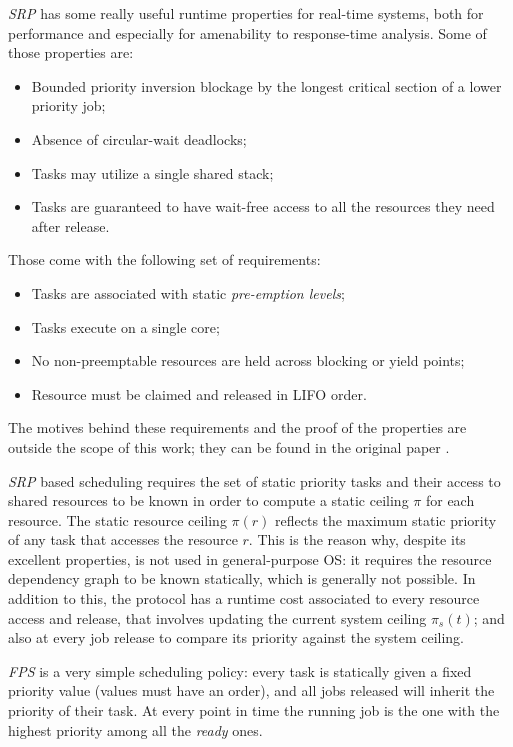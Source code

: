 \textit{SRP} has some really useful runtime properties for real-time systems,
both for performance and especially for amenability to response-time analysis.
Some of those properties are: 
\label{lab:rtic-properties}
\begin{itemize}
  \item Bounded priority inversion blockage by the longest critical section
  of a lower priority job; 
  \item Absence of circular-wait deadlocks;
  \item Tasks may utilize a single shared stack;
  \item Tasks are guaranteed to have wait-free access to all the resources
  they need after release. 
\end{itemize}
Those come with the following set of requirements:
\begin{itemize}
  \item Tasks are associated with static \textit{pre-emption levels};
  \item Tasks execute on a single core;
  \item No non-preemptable resources are held across blocking or yield points;
  \item Resource must be claimed and released in LIFO order.
\end{itemize}
The motives behind these requirements and the proof of the properties are
outside the scope of this work; they can be found in the original paper
\cite{bakerStackbasedSchedulingRealtime1991}. 

\textit{SRP} based scheduling requires the set of static priority tasks and
their access to shared resources to be known in order to compute a static
ceiling $\pi$ for each resource. The static resource ceiling $\pi(r)$ reflects
the maximum static priority of any task that accesses the resource $r$. This is
the reason why, despite its excellent properties, is not used in general-purpose
OS: it requires the resource dependency graph to be known statically, which is
generally not possible. In addition to this, the protocol has a runtime cost
associated to every resource access and release, that involves updating the
current system ceiling $\pi_s(t)$; and also at every job release to compare its
priority against the system ceiling. \label{lab:srp-in-general-purpose-os}

\textit{FPS} is a very simple scheduling policy: every task is statically given
a fixed priority value (values must have an order), and all jobs released will
inherit the priority of their task. At every point in time the running job is
the one with the highest priority among all the \textit{ready} ones. 

